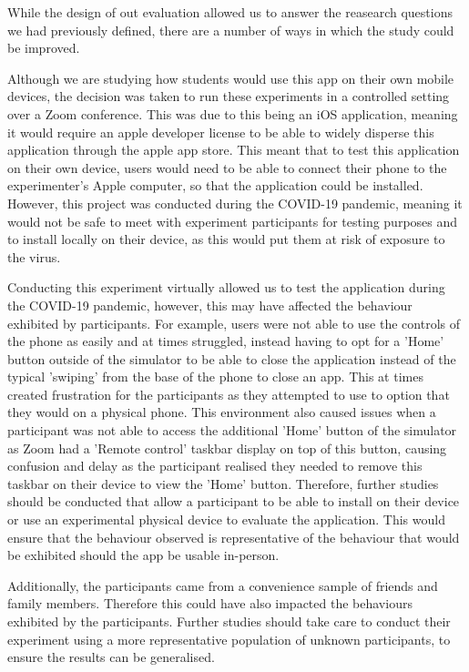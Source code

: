 \documentclass{l4proj}
\begin{document}
While the design of out evaluation allowed us to answer the reasearch questions we had previously defined, there are a number
of ways in which the study could be improved.
\par 
Although we are studying how students would use this app on their own mobile devices, the decision
was taken to run these experiments in a controlled setting over a Zoom conference. This was due to this being an iOS application,
meaning it would require an apple developer license to 
be able to widely disperse this application through the apple app store. This meant that to test
this application on their own device, users would need to be able to connect their phone to the experimenter's Apple computer, 
so that the application could be installed. However, this project was conducted
during the COVID-19 pandemic, meaning it would not be safe to meet with experiment participants
for testing purposes and to install locally on their device, as this would put them at risk of exposure to the virus. 
\par 
Conducting this experiment virtually allowed us to test the application during the COVID-19
pandemic, however, this may have affected the behaviour exhibited by participants. 
For example, users were not able to use the controls of the 
phone as easily and at times struggled, instead having to opt for a 'Home' button outside of the simulator to be able to close the application instead
of the typical 'swiping' from the base of the phone to close an app. This at times created frustration for the participants as 
they attempted to use to option that they would on a physical phone. This environment also caused issues when a participant was
not able to access the additional 'Home' button of the simulator as Zoom had a 'Remote control' taskbar display on top of this 
button, causing confusion and delay as the participant realised they needed to remove this taskbar on their device to view the
'Home' button. Therefore, further studies should be conducted that allow a participant to be able to install on their device 
or use an experimental physical device to evaluate the application. This would ensure that the behaviour observed is representative 
of the behaviour that would be exhibited should the app be usable in-person.
\par 
Additionally, the participants came from a convenience sample of friends and family members. Therefore this could have also impacted
the behaviours exhibited by the participants. Further studies should take care to conduct their experiment using a more representative 
population of unknown participants, to ensure the results can be generalised.
\end{document}
